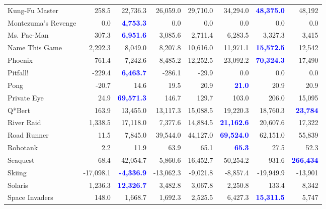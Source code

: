 \documentclass{article}
\begin{document}
\begin{figure}
\begin{tabular}{ l | r|r|r|r|r|r| r }
  Kung-Fu Master  &   258.5  &   22,736.3  &   26,059.0  &   29,710.0  &   34,294.0  &  \textbf{\textcolor{blue}{ 48,375.0}}  &  48,192\\
  Montezuma's Revenge  &   0.0  &  \textbf{\textcolor{blue}{ 4,753.3}}  &   0.0  &   0.0  &   0.0  &   0.0  &  0.0\\
  Ms. Pac-Man  &   307.3  &  \textbf{\textcolor{blue}{ 6,951.6}}  &   3,085.6  &   2,711.4  &   6,283.5  &   3,327.3  &  3,415\\
  Name This Game  &   2,292.3  &   8,049.0  &   8,207.8  &   10,616.0  &   11,971.1  &  \textbf{\textcolor{blue}{ 15,572.5}}  &  12,542\\
  Phoenix  &   761.4  &   7,242.6  &   8,485.2  &   12,252.5  &   23,092.2  &  \textbf{\textcolor{blue}{ 70,324.3}}  &  17,490\\
  Pitfall!  &   -229.4  &  \textbf{\textcolor{blue}{ 6,463.7}}  &   -286.1  &   -29.9  &   0.0  &   0.0  &  0.0\\
  Pong  &   -20.7  &   14.6  &   19.5  &   20.9  &  \textbf{\textcolor{blue}{ 21.0}}  &   20.9  &  20.9\\
  Private Eye  &   24.9  &  \textbf{\textcolor{blue}{ 69,571.3}}  &   146.7  &   129.7  &   103.0  &   206.0  &  15,095\\
  Q*Bert  &   163.9  &   13,455.0  &   13,117.3  &   15,088.5  &   19,220.3  &   18,760.3  &  \textbf{\textcolor{blue}{23,784}}\\
  River Raid  &   1,338.5  &   17,118.0  &   7,377.6  &   14,884.5  &  \textbf{\textcolor{blue}{ 21,162.6}}  &   20,607.6  &  17,322\\
  Road Runner  &   11.5  &   7,845.0  &   39,544.0  &   44,127.0  &  \textbf{\textcolor{blue}{ 69,524.0}}  &   62,151.0  &  55,839\\
  Robotank  &   2.2  &   11.9  &   63.9  &   65.1  &  \textbf{\textcolor{blue}{ 65.3}}  &   27.5  &  52.3\\
  Seaquest  &   68.4  &   42,054.7  &   5,860.6  &   16,452.7  &   50,254.2  &   931.6  &  \textbf{\textcolor{blue}{266,434}}\\
  Skiing  &   -17,098.1  &  \textbf{\textcolor{blue}{ -4,336.9}}  &   -13,062.3  &   -9,021.8  &   -8,857.4  &   -19,949.9  &  -13,901\\
  Solaris  &   1,236.3  &  \textbf{\textcolor{blue}{ 12,326.7}}  &   3,482.8  &   3,067.8  &   2,250.8  &   133.4  &  8,342\\
  Space Invaders  &   148.0  &   1,668.7  &   1,692.3  &   2,525.5  &   6,427.3  &  \textbf{\textcolor{blue}{ 15,311.5}}  &  5,747\\

\end{tabular}
\end{figure}
\end{document}
